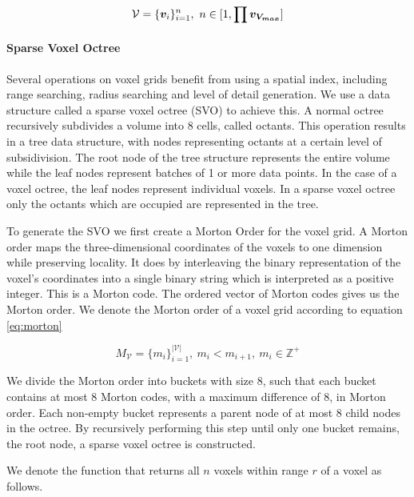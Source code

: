 \begin{equation}
    \label{eq:voxelgrid}
    \mathcal{V}=\{\boldsymbol{v}_{i}\}_{i=1}^{n},\ n \in [1, \prod{\boldsymbol{v_{V_{max}}}}]
\end{equation}



\paragraph{Sparse Voxel Octree}
Several operations on voxel grids benefit from using a spatial index, including range searching, radius searching and level of detail generation. We use a data structure called a sparse voxel octree (SVO) to achieve this. A normal octree recursively subdivides a volume into 8 cells, called octants. This operation results in a tree data structure, with nodes representing octants at a certain level of subsidivision. The root node of the tree structure represents the entire volume while the leaf nodes represent batches of 1 or more data points. In the case of a voxel octree, the leaf nodes represent individual voxels. In a sparse voxel octree only the octants which are occupied are represented in the tree. 

To generate the SVO we first create a Morton Order for the voxel grid. A Morton order maps the three-dimensional coordinates of the voxels to one dimension while preserving locality. It does by interleaving the binary representation of the voxel's coordinates into a single binary string which is interpreted as a positive integer. This is a Morton code. The ordered vector of Morton codes gives us the Morton order. We denote the Morton order of a voxel grid according to equation \ref{eq:morton}

\begin{equation}
    \label{eq:morton}
    M_{\mathcal{V}}=\{m_i\}_{i=1}^{|\mathcal{V}|},\ m_i < m_{i+1},\ m_i \in \mathbb{Z^+}
\end{equation}
    
We divide the Morton order into buckets with size 8, such that each bucket contains at most 8 Morton codes, with a maximum difference of 8, in Morton order. Each non-empty bucket represents a parent node of at most 8 child nodes in the octree. By recursively performing this step until only one bucket remains, the root node, a sparse voxel octree is constructed. 

We denote the function that returns all \(n\) voxels within range \(r\) of a voxel as follows.

